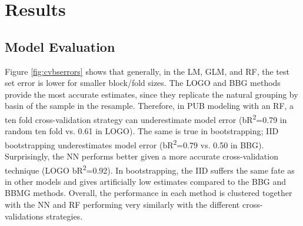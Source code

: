 

\section{Results}

\subsection{Model Evaluation}

Figure \ref{fig:cvbserrors} shows that generally, in the LM, GLM, and RF, the test set error is lower for smaller block/fold sizes. The LOGO and BBG methods provide the most accurate estimates, since they replicate the natural grouping by basin of the sample in the resample. Therefore, in PUB modeling with an RF, a ten fold cross-validation strategy can underestimate model error (bR\textsuperscript{2}=0.79 in random ten fold vs. 0.61 in LOGO). The same is true in bootstrapping;  IID bootstrapping underestimates model error (bR\textsuperscript{2}=0.79 vs. 0.50 in BBG). Surprisingly, the NN performs better given a more accurate cross-validation technique (LOGO bR\textsuperscript{2}=0.92). In bootstrapping, the IID suffers the same fate as in other models and gives artificially low estimates compared to the BBG and BBMG methods. Overall, the performance in each method is clustered together with the NN and RF performing very similarly with the different cross-validations strategies. 

